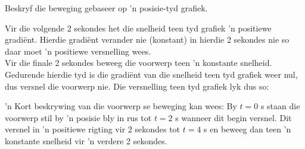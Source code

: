 \begin{wex}{Beskryf die beweging gebaseer op 'n posisie-tyd grafiek.}
{
Vir die volgende 2 sekondes het die snelheid teen tyd grafiek 'n positiewe gradi\"ent. Hierdie gradi\"ent verander nie (konstant) in hierdie 2 sekondes nie so daar moet 'n positiewe versnelling wees. \\

Vir die finale 2 sekondes beweeg die voorwerp teen 'n konstante snelheid. Gedurende hierdie tyd is die gradi\"ent van die snelheid teen tyd grafiek weer nul, dus versnel die voorwerp nie. Die versnelling teen tyd grafiek lyk dus so:

\begin{center}
\end{center}

 'n Kort beskrywing van die voorwerp se beweging kan wees: By $t=0$ s staan die voorwerp stil by 'n posisie bly in rus tot $t=2$ s wanneer dit begin versnel. Dit versnel in 'n positiewe rigting vir 2 sekondes tot $t=4$ s en beweeg dan teen 'n konstante snelheid vir 'n verdere 2 sekondes.
}
\end{wex}


